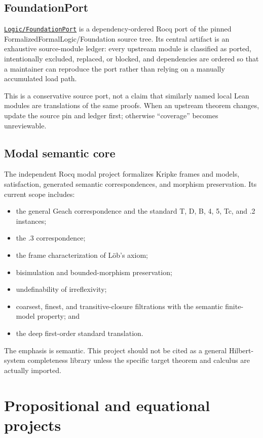 \documentclass[
  10pt,
  a4paper,
  twoside,
  open=any,
  parskip=half,
  headings=big
]{scrreprt}
\newcommand{\CommitFull}{56a402bf82a9aab119fcbe3e96b991d387b221c5}
\newcommand{\RepoWeb}{https://github.com/VladimirReshetnikov/ProveIt}
\newcommand{\RepoTreeBase}{\RepoWeb/tree/\CommitFull}
\newcommand{\project}[1]{\textsf{#1}}
\newcommand{\RepoDir}[1]{\href{\RepoTreeBase/#1}{\nolinkurl{#1}}}
\begin{document}
\subsection{FoundationPort}

\RepoDir{Logic/FoundationPort} is a dependency-ordered Rocq port of the pinned \project{FormalizedFormalLogic/Foundation} source tree. Its central artifact is an exhaustive source-module ledger: every upstream module is classified as ported, intentionally excluded, replaced, or blocked, and dependencies are ordered so that a maintainer can reproduce the port rather than relying on a manually accumulated load path.

This is a conservative source port, not a claim that similarly named local Lean modules are translations of the same proofs. When an upstream theorem changes, update the source pin and ledger first; otherwise ``coverage'' becomes unreviewable.

\subsection{Modal semantic core}

The independent Rocq modal project formalizes Kripke frames and models, satisfaction, generated semantic correspondences, and morphism preservation. Its current scope includes:

\begin{itemize}
  \item the general Geach correspondence and the standard T, D, B, 4, 5, Tc, and .2 instances;
  \item the .3 correspondence;
  \item the frame characterization of L\"ob's axiom;
  \item bisimulation and bounded-morphism preservation;
  \item undefinability of irreflexivity;
  \item coarsest, finest, and transitive-closure filtrations with the semantic finite-model property; and
  \item the deep first-order standard translation.
\end{itemize}

The emphasis is semantic. This project should not be cited as a general Hilbert-system completeness library unless the specific target theorem and calculus are actually imported.

\section{Propositional and equational projects}
\label{sec:propositional}
\end{document}
